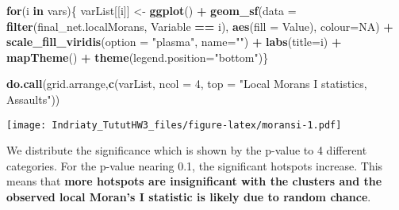\documentclass[
]{article}
\newenvironment{Shaded}{\begin{snugshade}}{\end{snugshade}}
\newcommand{\AttributeTok}[1]{\textcolor[rgb]{0.13,0.29,0.53}{#1}}
\newcommand{\ConstantTok}[1]{\textcolor[rgb]{0.56,0.35,0.01}{#1}}
\newcommand{\ControlFlowTok}[1]{\textcolor[rgb]{0.13,0.29,0.53}{\textbf{#1}}}
\newcommand{\DecValTok}[1]{\textcolor[rgb]{0.00,0.00,0.81}{#1}}
\newcommand{\FunctionTok}[1]{\textcolor[rgb]{0.13,0.29,0.53}{\textbf{#1}}}
\newcommand{\NormalTok}[1]{#1}
\newcommand{\OtherTok}[1]{\textcolor[rgb]{0.56,0.35,0.01}{#1}}
\newcommand{\SpecialCharTok}[1]{\textcolor[rgb]{0.81,0.36,0.00}{\textbf{#1}}}
\newcommand{\StringTok}[1]{\textcolor[rgb]{0.31,0.60,0.02}{#1}}
\begin{document}
\begin{Shaded}
\begin{Highlighting}[]
\ControlFlowTok{for}\NormalTok{(i }\ControlFlowTok{in}\NormalTok{ vars)\{}
\NormalTok{  varList[[i]] }\OtherTok{\textless{}{-}} 
    \FunctionTok{ggplot}\NormalTok{() }\SpecialCharTok{+}
      \FunctionTok{geom\_sf}\NormalTok{(}\AttributeTok{data =} \FunctionTok{filter}\NormalTok{(final\_net.localMorans, Variable }\SpecialCharTok{==}\NormalTok{ i), }
              \FunctionTok{aes}\NormalTok{(}\AttributeTok{fill =}\NormalTok{ Value), }\AttributeTok{colour=}\ConstantTok{NA}\NormalTok{) }\SpecialCharTok{+}
      \FunctionTok{scale\_fill\_viridis}\NormalTok{(}\AttributeTok{option =} \StringTok{"plasma"}\NormalTok{, }\AttributeTok{name=}\StringTok{""}\NormalTok{) }\SpecialCharTok{+}
      \FunctionTok{labs}\NormalTok{(}\AttributeTok{title=}\NormalTok{i) }\SpecialCharTok{+}
      \FunctionTok{mapTheme}\NormalTok{() }\SpecialCharTok{+} \FunctionTok{theme}\NormalTok{(}\AttributeTok{legend.position=}\StringTok{"bottom"}\NormalTok{)\}}

\FunctionTok{do.call}\NormalTok{(grid.arrange,}\FunctionTok{c}\NormalTok{(varList, }\AttributeTok{ncol =} \DecValTok{4}\NormalTok{, }\AttributeTok{top =} \StringTok{"Local Morans I statistics, Assaults"}\NormalTok{))}
\end{Highlighting}
\end{Shaded}

\texttt{[image: Indriaty\_TututHW3\_files/figure-latex/moransi-1.pdf]}

We distribute the significance which is shown by the p-value to 4
different categories. For the p-value nearing 0.1, the significant
hotspots increase. This means that \textbf{more hotspots are
insignificant with the clusters and the observed local Moran's I
statistic is likely due to random chance}.
\end{document}
